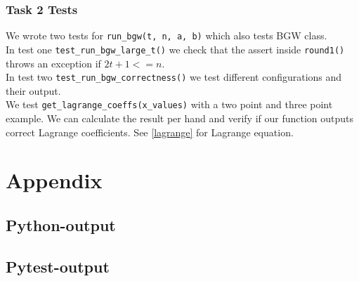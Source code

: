 \documentclass{article}
\begin{document}
		\subsubsection{Task 2 Tests}
        We wrote two tests for \lstinline{run_bgw(t, n, a, b)} which also tests BGW class.\\
        In test one \lstinline{test_run_bgw_large_t()} we check that the assert inside \lstinline{round1()} throws an exception if $2t+1 <= n$.\\
        In test two \lstinline{test_run_bgw_correctness()} we test different configurations and their output.\\
        We test \lstinline{get_lagrange_coeffs(x_values)} with a two point and three point example. We can calculate the result per hand and verify if our function outputs correct Lagrange coefficients. See \ref{lagrange} for Lagrange equation.
		
		\newpage
		\section{Appendix}
			\subsection{Python-output}\label{lst:python-output}
				
			\subsection{Pytest-output}
				\label{lst:pytest-output}
\end{document}
